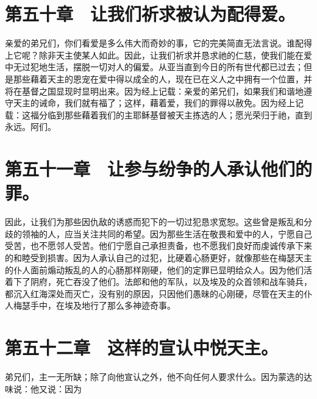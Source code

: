 
\section{第五十章　让我们祈求被认为配得爱。}

亲爱的弟兄们，你们看爱是多么伟大而奇妙的事，它的完美简直无法言说。谁配得上它呢？除非天主使某人如此。因此，让我们祈求并恳求祂的仁慈，使我们能在爱中无过犯地生活，摆脱一切对人的偏爱。从亚当直到今日的所有世代都已过去；但是那些藉着天主的恩宠在爱中得以成全的人，现在已在义人之中拥有一个位置，并将在基督之国显现时显明出来。因为经上记载：亲爱的弟兄们，如果我们和谐地遵守天主的诫命，我们就有福了；这样，藉着爱，我们的罪得以赦免。因为经上记载：这福分临到那些藉着我们的主耶稣基督被天主拣选的人；愿光荣归于祂，直到永远。阿们。\par


\section{第五十一章　让参与纷争的人承认他们的罪。}

因此，让我们为那些因仇敌的诱惑而犯下的一切过犯恳求宽恕。这些曾是叛乱和分歧的领袖的人，应当关注共同的希望。因为那些生活在敬畏和爱中的人，宁愿自己受苦，也不愿邻人受苦。他们宁愿自己承担责备，也不愿我们良好而虔诚传承下来的和睦受到损害。因为人承认自己的过犯，比硬着心肠更好，就像那些在梅瑟天主的仆人面前煽动叛乱的人的心肠那样刚硬，他们的定罪已显明给众人。因为他们活着下了阴府，死亡吞没了他们。法郎和他的军队，以及埃及的众首领和战车骑兵，都沉入红海深处而灭亡，没有别的原因，只因他们愚昧的心刚硬，尽管在天主的仆人梅瑟手中，在埃及地行了那么多神迹奇事。\par


\section{第五十二章　这样的宣认中悦天主。}

弟兄们，主一无所缺；除了向他宣认之外，他不向任何人要求什么。因为蒙选的达味说：他又说：因为\par

